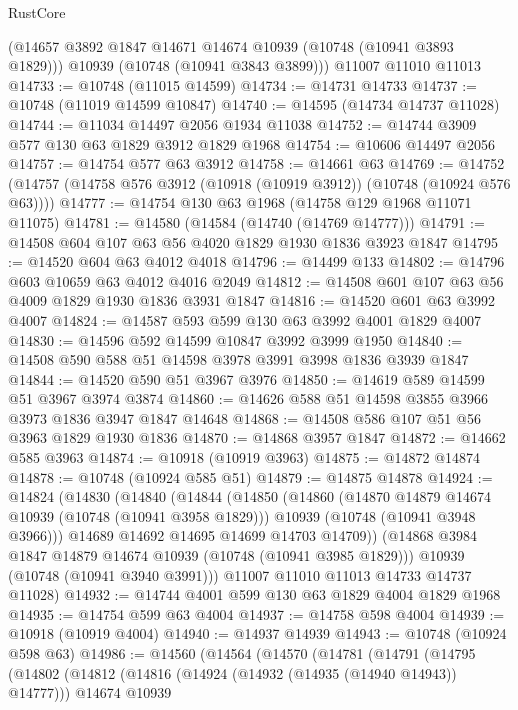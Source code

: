 \begin{lexlean}{RustCore}
\begin{coremodule}
      (@14657 @3892 @1847 @14671 @14674 @10939 (@10748 (@10941 @3893 @1829)))
      @10939
      (@10748 (@10941 @3843 @3899)))
    @11007
    @11010
    @11013
@14733 := @10748 (@11015 @14599)
@14734 := @14731 @14733
@14737 := @10748 (@11019 @14599 @10847)
@14740 := @14595 (@14734 @14737 @11028)
@14744 := @11034 @14497 @2056 @1934 @11038
@14752 := @14744 @3909 @577 @130 @63 @1829 @3912 @1829 @1968
@14754 := @10606 @14497 @2056
@14757 := @14754 @577 @63 @3912
@14758 := @14661 @63
@14769 := @14752 (@14757 (@14758 @576 @3912 (@10918 (@10919 @3912)) (@10748 (@10924 @576 @63))))
@14777 := @14754 @130 @63 @1968 (@14758 @129 @1968 @11071 @11075)
@14781 := @14580 (@14584 (@14740 (@14769 @14777)))
@14791 := @14508 @604 @107 @63 @56 @4020 @1829 @1930 @1836 @3923 @1847
@14795 := @14520 @604 @63 @4012 @4018
@14796 := @14499 @133
@14802 := @14796 @603 @10659 @63 @4012 @4016 @2049
@14812 := @14508 @601 @107 @63 @56 @4009 @1829 @1930 @1836 @3931 @1847
@14816 := @14520 @601 @63 @3992 @4007
@14824 := @14587 @593 @599 @130 @63 @3992 @4001 @1829 @4007
@14830 := @14596 @592 @14599 @10847 @3992 @3999 @1950
@14840 := @14508 @590 @588 @51 @14598 @3978 @3991 @3998 @1836 @3939 @1847
@14844 := @14520 @590 @51 @3967 @3976
@14850 := @14619 @589 @14599 @51 @3967 @3974 @3874
@14860 := @14626 @588 @51 @14598 @3855 @3966 @3973 @1836 @3947 @1847 @14648
@14868 := @14508 @586 @107 @51 @56 @3963 @1829 @1930 @1836
@14870 := @14868 @3957 @1847
@14872 := @14662 @585 @3963
@14874 := @10918 (@10919 @3963)
@14875 := @14872 @14874
@14878 := @10748 (@10924 @585 @51)
@14879 := @14875 @14878
@14924 := @14824
    (@14830
      (@14840
        (@14844
          (@14850
            (@14860
              (@14870 @14879 @14674 @10939 (@10748 (@10941 @3958 @1829)))
              @10939
              (@10748 (@10941 @3948 @3966)))
            @14689
            @14692
            @14695
            @14699
            @14703
            @14709))
        (@14868 @3984 @1847 @14879 @14674 @10939 (@10748 (@10941 @3985 @1829)))
        @10939
        (@10748 (@10941 @3940 @3991)))
      @11007
      @11010
      @11013
      @14733
      @14737
      @11028)
@14932 := @14744 @4001 @599 @130 @63 @1829 @4004 @1829 @1968
@14935 := @14754 @599 @63 @4004
@14937 := @14758 @598 @4004
@14939 := @10918 (@10919 @4004)
@14940 := @14937 @14939
@14943 := @10748 (@10924 @598 @63)
@14986 := @14560
    (@14564
      (@14570
        (@14781
          (@14791
            (@14795
              (@14802
                (@14812
                  (@14816 (@14924 (@14932 (@14935 (@14940 @14943)) @14777)))
                  @14674
                  @10939

\end{coremodule}
\end{lexlean}
